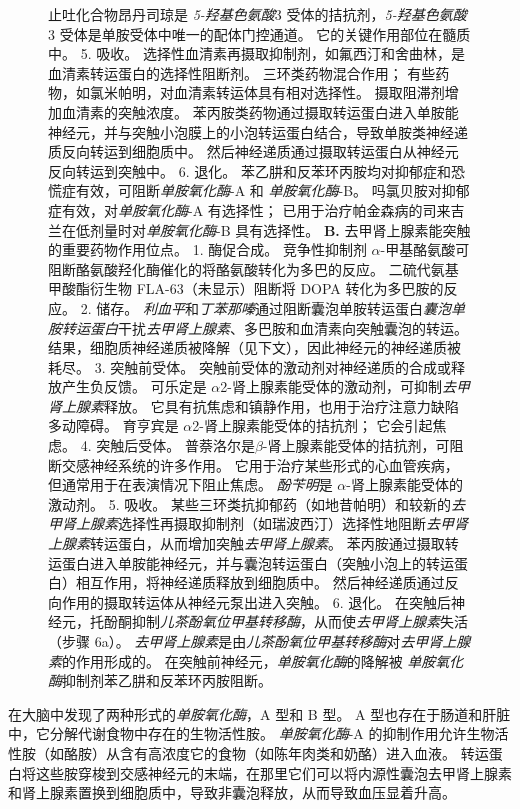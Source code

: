 \begin{figure}[htbp]
{	止吐化合物昂丹司琼是 \textit{5-羟基色氨酸}3 受体的拮抗剂，\textit{5-羟基色氨酸}3 受体是单胺受体中唯一的配体门控通道。
	它的关键作用部位在髓质中。
	5. 吸收。
	选择性血清素再摄取抑制剂，如氟西汀和舍曲林，是血清素转运蛋白的选择性阻断剂。
	三环类药物混合作用；
	有些药物，如氯米帕明，对血清素转运体具有相对选择性。
	摄取阻滞剂增加血清素的突触浓度。
	苯丙胺类药物通过摄取转运蛋白进入单胺能神经元，并与突触小泡膜上的小泡转运蛋白结合，导致单胺类神经递质反向转运到细胞质中。
	然后神经递质通过摄取转运蛋白从神经元反向转运到突触中。
	6. 退化。
	苯乙肼和反苯环丙胺均对抑郁症和恐慌症有效，可阻断\textit{单胺氧化酶}-A 和 \textit{单胺氧化酶}-B。
	吗氯贝胺对抑郁症有效，对\textit{单胺氧化酶}-A 有选择性；
	已用于治疗帕金森病的司来吉兰在低剂量时对\textit{单胺氧化酶}-B 具有选择性。 
	\textbf{B.} 去甲肾上腺素能突触的重要药物作用位点。 
	1. 酶促合成。
	竞争性抑制剂 $\alpha$-甲基酪氨酸可阻断酪氨酸羟化酶催化的将酪氨酸转化为多巴的反应。
	二硫代氨基甲酸酯衍生物 FLA-63（未显示）阻断将 DOPA 转化为多巴胺的反应。
	2. 储存。
	\textit{利血平}和\textit{丁苯那嗪}通过阻断囊泡单胺转运蛋白\textit{囊泡单胺转运蛋白}干扰\textit{去甲肾上腺素}、多巴胺和血清素向突触囊泡的转运。
	结果，细胞质神经递质被降解（见下文），因此神经元的神经递质被耗尽。
	3. 突触前受体。
	突触前受体的激动剂对神经递质的合成或释放产生负反馈。
	可乐定是 $\alpha$2-肾上腺素能受体的激动剂，可抑制\textit{去甲肾上腺素}释放。
	它具有抗焦虑和镇静作用，也用于治疗注意力缺陷多动障碍。
	育亨宾是 $\alpha$2-肾上腺素能受体的拮抗剂； 它会引起焦虑。
	4. 突触后受体。
	普萘洛尔是$\beta$-肾上腺素能受体的拮抗剂，可阻断交感神经系统的许多作用。
	它用于治疗某些形式的心血管疾病，但通常用于在表演情况下阻止焦虑。
	\textit{酚苄明}是 $\alpha$-肾上腺素能受体的激动剂。
	5. 吸收。
	某些三环类抗抑郁药（如地昔帕明）和较新的\textit{去甲肾上腺素}选择性再摄取抑制剂（如瑞波西汀）选择性地阻断\textit{去甲肾上腺素}转运蛋白，从而增加突触\textit{去甲肾上腺素}。
	苯丙胺通过摄取转运蛋白进入单胺能神经元，并与囊泡转运蛋白（突触小泡上的转运蛋白）相互作用，将神经递质释放到细胞质中。
	然后神经递质通过反向作用的摄取转运体从神经元泵出进入突触。
	6. 退化。
	在突触后神经元，托酚酮抑制\textit{儿茶酚氧位甲基转移酶}，从而使\textit{去甲肾上腺素}失活（步骤 6a）。
	\textit{去甲肾上腺素}是由\textit{儿茶酚氧位甲基转移酶}对\textit{去甲肾上腺素}的作用形成的。
	在突触前神经元，\textit{单胺氧化酶}的降解被 \textit{单胺氧化酶}抑制剂苯乙肼和反苯环丙胺阻断。}
\end{figure}


在大脑中发现了两种形式的\textit{单胺氧化酶}，A 型和 B 型。
A 型也存在于肠道和肝脏中，它分解代谢食物中存在的生物活性胺。
\textit{单胺氧化酶}-A 的抑制作用允许生物活性胺（如酪胺）从含有高浓度它的食物（如陈年肉类和奶酪）进入血液。
转运蛋白将这些胺穿梭到交感神经元的末端，在那里它们可以将内源性囊泡去甲肾上腺素和肾上腺素置换到细胞质中，导致非囊泡释放，从而导致血压显着升高。


